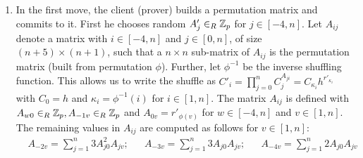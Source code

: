 \begin{enumerate}
  \item %
    In the first move, the client (prover) builds a permutation matrix and commits to it.
    First he chooses random $A'_j\in_R\mathbb{Z}_p$ for $j\in[-4,n]$.
    Let $A_{ij}$ denote a matrix with $i\in[-4,n]$ and $j\in[0,n]$, \ie of size $(n+5)\times (n+1)$, such that a $n\times n$ sub-matrix of $A_{ij}$ is the permutation matrix (built from permutation $\phi$).
    Further, let $\phi^{-1}$ be the inverse shuffling function.
    This allows us to write the shuffle as $C'_{i}=\prod_{j=0}^{n}C_{j}^{A_{ji}}=C_{\kappa_i}h^{r'_{\kappa_i}}$ with $C_0=h$ and $\kappa_i=\phi^{-1}(i)$ for $i\in[1,n]$.
    The matrix $A_{ij}$ is defined with $A_{w0}\in_R\mathbb{Z}_p, A_{-1v}\in_R\mathbb{Z}_p$ and $A_{0v}=r'_{\phi(v)}$ for $w\in[-4,n]$ and $v\in[1,n]$.
    The remaining values in $A_{ij}$ are computed as follows for $v\in[1,n]$:
    \begin{align*}      
    & A_{-2v}=\sum_{j=1}^{n} 3A_{j0}^2 A_{jv}; && A_{-3v}=\sum_{j=1}^{n} 3A_{j0} A_{jv}; && A_{-4v}=\sum_{j=1}^{n} 2A_{j0} A_{jv}
    \end{align*}



\end{enumerate}
